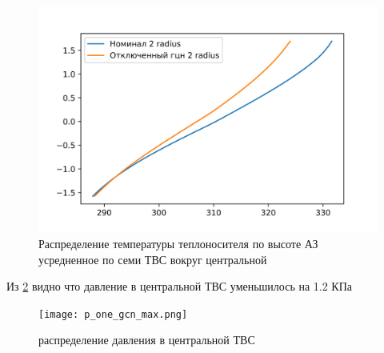 \begin{figure}[H]
	\begin{center}
		\includegraphics{treton_one_gcn_2_radius_T.png}
		\caption{Распределение температуры теплоносителя по высоте АЗ усредненное по семи ТВС вокруг центральной}
		\label{pic:treton-one-gcn-2-radius-T}
	\end{center}
\end{figure}

Из \ref{pic:p-one-gcn-max} видно что давление в центральной ТВС уменьшилось на 1.2 КПа

\begin{figure}[H]
	\begin{center}
		\texttt{[image: p\_one\_gcn\_max.png]}
		\caption{распределение давления в центральной ТВС}
		\label{pic:p-one-gcn-max}
	\end{center}
\end{figure}



